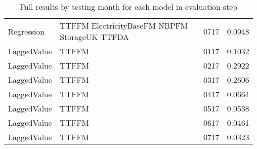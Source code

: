 \begin{table}[h!]
\begin{adjustbox}{max width=\textwidth}
\begin{tabular}{lllr}
  Regression & TTFFM ElectricityBaseFM NBPFM StorageUK TTFDA & 0717 & 0.0948 \\ 
  LaggedValue & TTFFM  & 0117 & 0.1032 \\ 
  LaggedValue & TTFFM  & 0217 & 0.2922 \\ 
  LaggedValue & TTFFM  & 0317 & 0.2606 \\ 
  LaggedValue & TTFFM  & 0417 & 0.0664 \\ 
  LaggedValue & TTFFM  & 0517 & 0.0538 \\ 
  LaggedValue & TTFFM  & 0617 & 0.0461 \\ 
  LaggedValue & TTFFM  & 0717 & 0.0323 \\ 
   \hline
 \end{tabular}
\end{adjustbox}
\caption{Full results by testing month for each model in evaluation step} 
\label{tab:level.eval.short}
\end{table}

